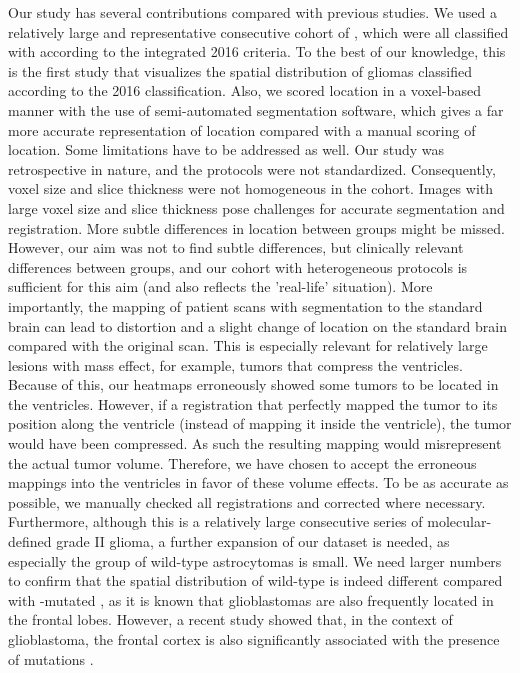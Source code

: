 Our study has several contributions compared with previous studies.
We used a relatively large and representative consecutive cohort of , which were all classified with  according to the integrated  2016 criteria.
To the best of our knowledge, this is the first study that visualizes the spatial distribution of gliomas classified according to the  2016 classification.
Also, we scored location in a voxel-based manner with the use of semi-automated segmentation software, which gives a far more accurate representation of location compared with a manual scoring of location.
Some limitations have to be addressed as well.
Our study was retrospective in nature, and the  protocols were not standardized.
Consequently, voxel size and slice thickness were not homogeneous in the cohort.
Images with large voxel size and slice thickness pose challenges for accurate segmentation and registration.
More subtle differences in location between groups might be missed.
However, our aim was not to find subtle differences, but clinically relevant differences between groups, and our cohort with heterogeneous  protocols is sufficient for this aim (and also reflects the 'real-life' situation).
More importantly, the mapping of patient  scans with segmentation to the  standard brain can lead to distortion and a slight change of location on the standard brain compared with the original  scan.
This is especially relevant for relatively large lesions with mass effect, for example, \glspl{tumor} that compress the ventricles.
Because of this, our heatmaps erroneously showed some \glspl{tumor} to be located in the ventricles.
However, if a registration that perfectly mapped the \gls{tumor} to its position along the ventricle (instead of mapping it inside the ventricle), the \gls{tumor} would have been compressed.
As such the resulting mapping would misrepresent the actual \gls{tumor} volume.
Therefore, we have chosen to accept the erroneous mappings into the ventricles in favor of these volume effects.
To be as accurate as possible, we manually checked all registrations and corrected where necessary.
Furthermore, although this is a relatively large consecutive series of molecular-defined grade II glioma, a further expansion of our dataset is needed, as especially the group of  wild-type astrocytomas is small.
We need larger numbers to confirm that the spatial distribution of  wild-type  is indeed different compared with -mutated , as it is known that glioblastomas are also frequently located in the frontal lobes.
However, a recent study showed that, in the context of glioblastoma, the frontal cortex is also significantly associated with the presence of  mutations \autocite{tejada2018voxel}.

